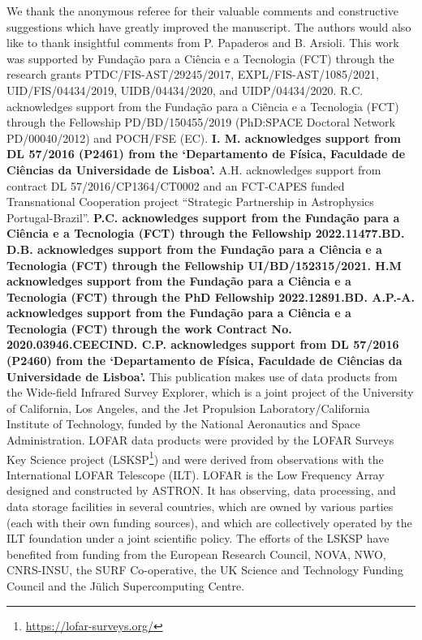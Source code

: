 \documentclass{aa}
\begin{document}
\begin{acknowledgements}
We thank the anonymous referee for their valuable comments
and constructive suggestions which have greatly improved the
manuscript. The authors would also like to thank insightful comments from P. Papaderos and B. Arsioli.
This work was supported by Fundação para a Ciência e a Tecnologia (FCT) through the research grants PTDC/FIS-AST/29245/2017, EXPL/FIS-AST/1085/2021, UID/FIS/04434/2019, UIDB/04434/2020, and UIDP/04434/2020. R.C. acknowledges support from the Fundação para a Ciência e a Tecnologia (FCT) through the Fellowship PD/BD/150455/2019 (PhD:SPACE Doctoral Network PD/00040/2012) and POCH/FSE (EC). \textbf{I. M. acknowledges support from DL 57/2016 (P2461) from the `Departamento de Física, Faculdade de Ciências da Universidade de Lisboa'.} A.H. acknowledges support from contract DL 57/2016/CP1364/CT0002 and an FCT-CAPES funded Transnational Cooperation project ``Strategic Partnership in Astrophysics Portugal-Brazil''. \textbf{P.C. acknowledges support from the Fundação para a Ciência e a Tecnologia (FCT) through the Fellowship 2022.11477.BD. D.B. acknowledges support from the Fundação para a Ciência e a Tecnologia (FCT) through the Fellowship UI/BD/152315/2021. H.M acknowledges support from the Fundação para a Ciência e a Tecnologia (FCT) through the PhD Fellowship 2022.12891.BD. A.P.-A. acknowledges support from the Fundação para a Ciência e a Tecnologia (FCT) through the work Contract No. 2020.03946.CEECIND. C.P. acknowledges support from DL 57/2016 (P2460) from the `Departamento de Física, Faculdade de Ciências da Universidade de Lisboa'.}
This publication makes use of data products from the Wide-field Infrared Survey Explorer, which is a joint project of the University of California, Los Angeles, and the Jet Propulsion Laboratory/California Institute of Technology, funded by the National Aeronautics and Space Administration.
LOFAR data products were provided by the LOFAR Surveys Key Science project (LSKSP\footnote{\url{https://lofar-surveys.org/}}) and were derived from observations with the International LOFAR Telescope (ILT). LOFAR \citep{2013A&A...556A...2V} is the Low Frequency Array designed and constructed by ASTRON. It has observing, data processing, and data storage facilities in several countries, which are owned by various parties (each with their own funding sources), and which are collectively operated by the ILT foundation under a joint scientific policy. The efforts of the LSKSP have benefited from funding from the European Research Council, NOVA, NWO, CNRS-INSU, the SURF Co-operative, the UK Science and Technology Funding Council and the Jülich Supercomputing Centre.

\end{acknowledgements}
\end{document}
